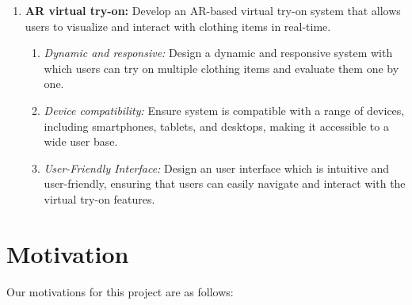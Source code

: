 \begin{enumerate}
\begin{enumerate}
			\end{enumerate}
		\item \textbf{AR virtual try-on:} Develop an AR-based virtual try-on system that allows users to visualize and interact with clothing items in real-time.
			\begin{enumerate}
				\item \textit{Dynamic and responsive:} Design a dynamic and responsive system with which users can try on multiple clothing items and evaluate them one by one.
				\item \textit{Device compatibility:} Ensure system is compatible with a range of devices, including smartphones, tablets, and desktops, making it accessible to a wide user base.
				\item \textit{User-Friendly Interface:} Design an user interface which is intuitive and user-friendly, ensuring that users can easily navigate and interact with the virtual try-on features.
			\end{enumerate}
	\end{enumerate}

\section{Motivation}
	Our motivations for this project are as follows:

